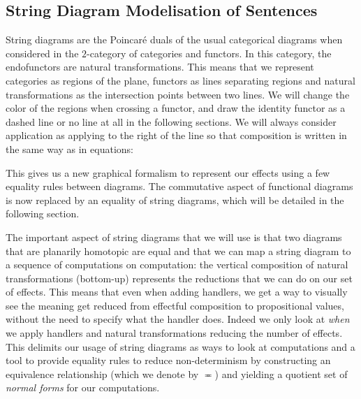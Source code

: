 \documentclass[math, english, info]{cours}
\begin{document}
\subsection{String Diagram Modelisation of Sentences}
\label{subsec:sd}
String diagrams are the Poincaré duals of the usual categorical diagrams when considered in the $2$-category of categories and functors.
In this category, the endofunctors are natural transformations.
This means that we represent categories as regions of the plane, functors as lines separating regions and natural transformations as the intersection points between two lines.
We will change the color of the regions when crossing a functor, and draw the identity functor as a dashed line or no line at all in the following sections.
We will always consider application as applying to the right of the line so that composition is written in the same way as in equations:
\begin{center}
\end{center}
This gives us a new graphical formalism to represent our effects using a few equality rules between diagrams.
The commutative aspect of functional diagrams is now replaced by an equality of string diagrams, which will be detailed in the following section.

The important aspect of string diagrams that we will use is that two diagrams that are planarily homotopic are equal \cite{delpeuchNormalizationPlanarString2022} and that we can map a string diagram to a sequence of computations on computation: the vertical composition of natural transformations (bottom-up) represents the reductions that we can do on our set of effects.
This means that even when adding handlers, we get a way to visually see the meaning get reduced from effectful composition to propositional values, without the need to specify what the handler does.
Indeed we only look at \emph{when} we apply handlers and natural transformations reducing the number of effects.
This delimits our usage of string diagrams as ways to look at computations and a tool to provide equality rules to reduce non-determinism by constructing an equivalence relationship (which we denote by $\eqcirc$) and yielding a quotient set of \emph{normal forms} for our computations.
\end{document}
